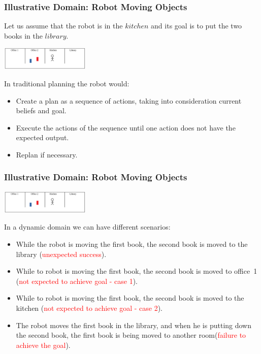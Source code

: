 \documentclass[xcolor=dvipsnames]{beamer}
\begin{document}
\begin{frame}
\frametitle{Illustrative Domain: Robot Moving Objects}

Let us assume that the robot is in the $kitchen$ and its goal is to put the two books in the $library$.
  \begin{center}
    \includegraphics[height=3em]{Images/fourrooms2}\hspace{2em} 
  \end{center}

In traditional planning the robot would:

    \begin{itemize}
    \item Create a plan as a sequence of actions, taking into consideration current beliefs and goal.
    \item Execute the actions of the sequence until one action does not have the expected output.
    \item Replan if necessary.

    \end{itemize}

\end{frame}




\begin{frame}
\frametitle{Illustrative Domain: Robot Moving Objects}
  \begin{center}
    \includegraphics[height=3em]{Images/fourrooms2}\hspace{2em} 
  \end{center}
In a dynamic domain we can have different scenarios:
    \begin{itemize}
    \item While the robot is moving the first book, the second book is moved to the library (\textcolor{red}{unexpected success}).
    \item While to robot is moving the first book, the second book is moved to office\ 1 (\textcolor{red}{not expected to achieve goal - case 1}).
    \item While to robot is moving the first book, the second book is moved to the kitchen (\textcolor{red}{not expected to achieve goal - case 2}).
    \item The robot moves the first book in the library, and when he is putting down the second book, 
the first book is being moved to another room(\textcolor{red}{failure to achieve the goal}).  

     \end{itemize}
\end{frame}
\end{document}
